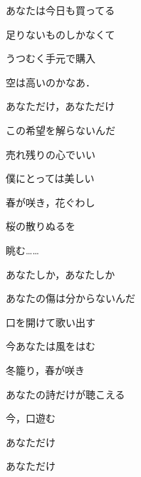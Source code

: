 \documentclass[uplatex, dvipdfmx, twocolumn]{jsarticle}
\begin{document}
あなたは今日も買ってる

足りないものしかなくて

うつむく手元で購入

空は高いのかなあ．

\vspace{2mm}

あなただけ，あなただけ

この希望を解らないんだ

売れ残りの心でいい

僕にとっては美しい

春が咲き，花ぐわし

桜の散りぬるを

眺む……

\vspace{2mm}

あなたしか，あなたしか

あなたの傷は分からないんだ

口を開けて歌い出す

今あなたは風をはむ

冬籠り，春が咲き

あなたの詩だけが聴こえる

今，口遊む

あなただけ

あなただけ
\end{document}
